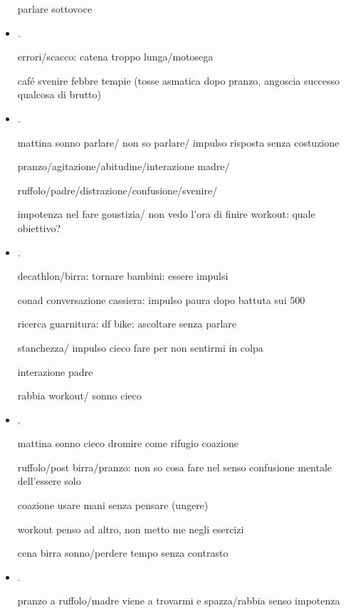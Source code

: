 \begin{itemize}
parlare sottovoce

\item {}.

errori/scacco: catena troppo lunga/motosega

caf\'e svenire febbre tempie (tosse asmatica dopo pranzo, angoscia successo qualcosa di brutto)




\item {}.

mattina sonno parlare/ non so parlare/ impulso risposta senza costuzione

pranzo/agitazione/abitudine/interazione madre/


ruffolo/padre/distrazione/confusione/svenire/

impotenza nel fare goustizia/ non vedo l’ora di finire workout: quale obiettivo?

\item {}.

decathlon/birra: tornare bambini: essere impulsi

conad conversazione cassiera: impulso paura dopo battuta sui 500

ricerca guarnitura: df bike: ascoltare senza parlare

stanchezza/ impulso cieco fare per non sentirmi in colpa

interazione padre

rabbia workout/ sonno cieco


\item {}.

mattina sonno cieco dromire come rifugio coazione

ruffolo/post birra/pranzo: non so cosa fare nel senso confusione mentale dell’essere solo

coazione usare mani senza pensare (ungere)

workout penso ad altro, non metto me negli esercizi

cena birra sonno/perdere tempo senza contrasto

\item {}.

pranzo a ruffolo/madre viene a trovarmi e spazza/rabbia senso impotenza


\end{itemize}
